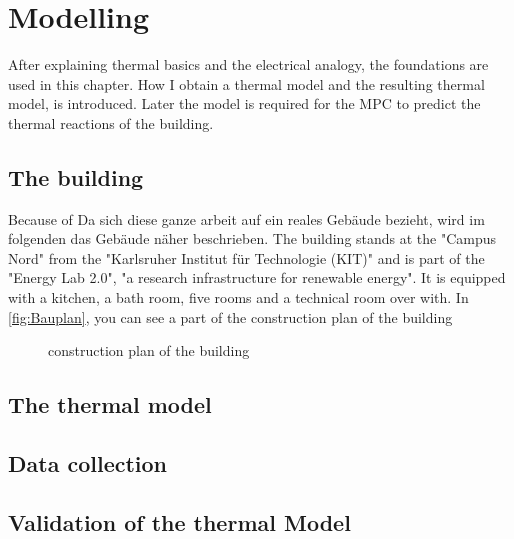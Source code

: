 \chapter{Modelling}
\label{ch:modelling}
After explaining thermal basics and the electrical analogy, the foundations are used in this chapter. How I obtain a thermal model and the resulting thermal model, is introduced. Later the model is required for the MPC to predict the thermal reactions of the building. 

\section{The building}
\label{section:building}
Because of Da sich diese ganze arbeit auf ein reales Gebäude bezieht, wird im folgenden das Gebäude näher beschrieben.
\newline
The building stands at the "Campus Nord" from the "Karlsruher Institut für Technologie (KIT)" and is part of the "Energy Lab 2.0", "a research infrastructure for renewable energy"\cite{KIT.2021}. It is equipped with a kitchen, a bath room, five rooms and a technical room over with. In \autoref{fig:Bauplan}, you can see a part of the construction plan of the building

\begin{figure}
    \centering
    \def\svgwidth{320pt}
    
    \caption{construction plan of the building \cite{Bauplan}}
    \label{fig:Bauplan}
\end{figure}
\section{The thermal model}
\label{thermalmodel}

\section{Data collection}

\section{Validation of the thermal Model}
\label{validationthermalmodel}



